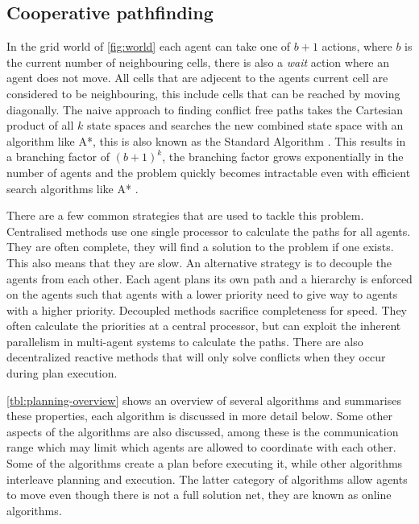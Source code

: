 \subsection{Cooperative pathfinding}
In the grid world of \autoref{fig:world} each agent can take one of $b+1$
actions, where $b$ is the
current number of neighbouring cells, there is also a \textit{wait} action
where an agent does not move. All cells that are adjecent to the agents current
cell are considered to be neighbouring, this include cells that can be reached
by moving diagonally. The naive approach to finding conflict free paths
takes the Cartesian product of all $k$ state spaces and searches the new
combined state space with an algorithm like A*, this is also known as the
Standard Algorithm \cite{standley2010}. This results in a branching factor of
$(b+1)^k$, the branching factor grows exponentially in the number of agents and
the problem quickly becomes intractable even with efficient search algorithms
like A* \cite{sharon2013}.

There are a few common strategies that are used to tackle this problem.
Centralised methods use one single processor to calculate the paths for all
agents. They are often complete, they will find a solution to the problem if
one exists. This also means that they are slow. An alternative strategy is to
decouple the agents from each other. Each agent plans its own path and a
hierarchy is enforced on the agents such that agents with a lower priority need
to give way to agents with a higher priority. Decoupled methods sacrifice
completeness for speed. They often calculate the priorities at a central
processor, but can exploit the inherent parallelism in multi-agent systems to
calculate the paths. There are also decentralized reactive methods that will
only solve conflicts when they occur during plan execution.

\autoref{tbl:planning-overview} shows an overview of several algorithms and
summarises these properties, each algorithm is discussed in more detail below.
Some other aspects of the algorithms are also discussed, among these is the
communication range which may limit which agents are allowed to coordinate with
each other. Some of the algorithms create a plan before executing it, while
other algorithms interleave planning and execution. The latter category of
algorithms allow agents to move even though there is not a full solution net,
they are known as online algorithms.

